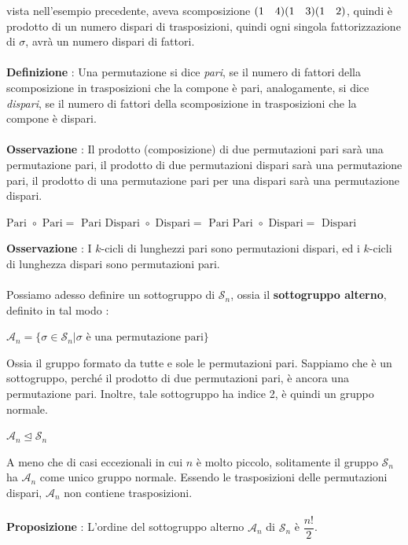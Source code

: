 \documentclass[12pt, letterpaper]{article}
\newcommand{\Sn}{{\mathcal S_n}}
\newcommand{\An}{{\mathcal A_n}}
\newcommand{\spaz}{{\text{\hphantom{aa}}}}
\newcommand{\acc}{\\\hphantom{}\\}
\newcommand{\norm}{{\unlhd}}
\begin{document}
vista nell'esempio precedente, aveva scomposizione \((1\spaz4)(1\spaz3)(1\spaz2)\), quindi è prodotto di un numero dispari 
di trasposizioni, quindi ogni singola fattorizzazione di \(\sigma\), avrà un numero dispari di fattori.\acc 
\textbf{Definizione} : Una permutazione si dice \textit{pari}, se il numero di fattori della scomposizione 
in trasposizioni che la compone è pari, analogamente, si dice \textit{dispari}, se il numero di fattori della scomposizione 
in trasposizioni che la compone è dispari.\acc 
\textbf{Osservazione} : Il prodotto (composizione) di due permutazioni pari sarà una permutazione  pari, il prodotto di due 
permutazioni dispari sarà una permutazione  pari, il prodotto di una permutazione pari per una dispari sarà una permutazione  
dispari.
\begin{center}
    \(\text{Pari }\circ\text{ Pari}=\text{ Pari}\)\hphantom{aaaaaaa}
    \(\text{Dispari }\circ\text{ Dispari}=\text{ Pari}\)\hphantom{aaaaaaa}
    \(\text{Pari }\circ\text{ Dispari}=\text{ Dispari}\)
\end{center}
\textbf{Osservazione} : I \(k\)-cicli di lunghezzi pari sono permutazioni dispari, ed i \(k\)-cicli di 
lunghezza dispari sono permutazioni pari.\acc

Possiamo adesso definire un sottogruppo di \(\Sn\), ossia il \textbf{sottogruppo alterno}, definito in tal modo :
\begin{center}
    \(
    \An = \{\sigma\in\Sn|\sigma\text{ è una permutazione pari}\}    
    \)
\end{center}
Ossia il gruppo formato da tutte e sole le permutazioni pari. Sappiamo che è un sottogruppo, perché 
il prodotto di due permutazioni pari, è ancora una permutazione pari. Inoltre, tale sottogruppo ha indice 
2, è quindi un gruppo normale.\begin{center}
    \(\An \norm \Sn\)
\end{center}
A meno che di casi eccezionali in cui \(n\) è molto piccolo, solitamente il gruppo \(\Sn\) ha  
\(\An\) come unico gruppo normale. Essendo le trasposizioni delle permutazioni dispari, \(\An\) 
non contiene trasposizioni.\acc 
\textbf{Proposizione }: L'ordine del sottogruppo alterno \(\An\) di \(\Sn\) è \(\dfrac{n!}{2}\).

\newpage
\end{document}
